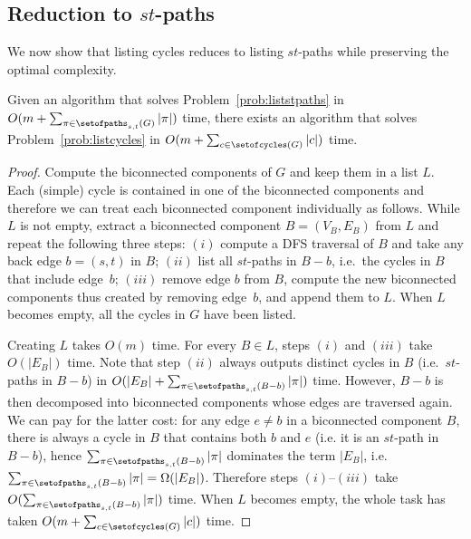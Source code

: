 \subsection{Reduction to $st$-paths}
\label{sub:reduction-paths}

We now show that listing cycles reduces to listing $st$-paths while
preserving the optimal complexity.  

\begin{lemma}
  \label{lemma:reduction}
  Given an algorithm that solves Problem~\ref{prob:liststpaths} in
  \mbox{$O(m + \sum_{\pi \in \setofpaths_{s,t}(G)}{|\pi|})$}
  time, there exists an algorithm that solves
  Problem~\ref{prob:listcycles} in \mbox{$O(m + \sum_{c \in
  \setofcycles(G)}{|c|})$} time.
\end{lemma}
\begin{proof}
  Compute the biconnected components of $G$ and keep them in a list
  $L$. Each (simple) cycle is contained in one of the biconnected
  components and therefore we can treat each biconnected component
  individually as follows. While $L$ is not empty, extract a biconnected
  component $B=(V_{B},E_{B})$ from $L$ and repeat the following three
  steps: $(i)$ compute a DFS traversal of $B$ and take any back edge
  $b=(s,t)$ in $B$; $(ii)$ list all $st$-paths in $B-b$, i.e.~the
  cycles in $B$ that include edge~$b$; $(iii)$ remove edge $b$ from
  $B$, compute the new biconnected components thus created by removing
  edge~$b$, and append them to $L$. When $L$ becomes empty, all the
  cycles in $G$ have been listed.

  Creating $L$ takes $O(m)$ time. For every $B \in L$, steps $(i)$ and
  $(iii)$ take $O(|E_B|)$ time.  Note that step $(ii)$ always outputs
  distinct cycles in $B$ (i.e.~$st$-paths in $B-b$) in
  $O(|E_{B}|+\sum_{\pi \in \setofpaths_{s,t}(B-b)}{|\pi|})$ time.
  However, $B-b$ is then decomposed into biconnected components whose
  edges are traversed again. We can pay for the latter cost: for any
  edge $e \neq b$ in a biconnected component $B$, there is always a
  cycle in $B$ that contains both $b$ and $e$ (i.e.\mbox{} it is an
  $st$-path in $B-b$), hence $\sum_{\pi \in
    \setofpaths_{s,t}(B-b)}{|\pi|}$ dominates the term $|E_{B}|$,
  i.e.~$\sum_{\pi \in \setofpaths_{s,t}(B-b)}{|\pi|}=
  \Omega(|E_{B}|)$.  Therefore steps $(i)$--$(iii)$ take $O(\sum_{\pi
    \in \setofpaths_{s,t}(B-b)}{|\pi|})$ time. When $L$ becomes empty,
  the whole task has taken $O(m + \sum_{c \in \setofcycles(G)}{|c|})$
  time.
\end{proof}



